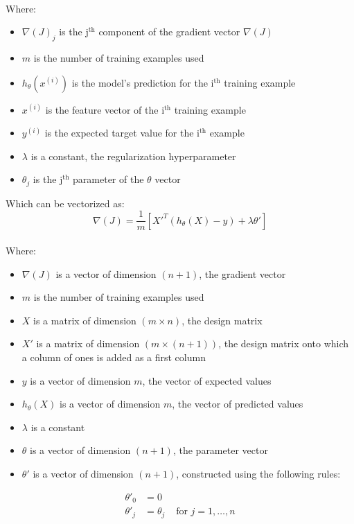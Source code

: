 \\
Where:  
\begin{itemize}
    \item $\nabla(J)_j$ is the j$^\text{th}$ component of the gradient vector $\nabla(J)$
    \item $m$ is the number of training examples used
    \item $h_\theta(x^{(i)})$ is the model's prediction for the i$^\text{th}$ training example
    \item $x^{(i)}$ is the feature vector of the i$^\text{th}$ training example
    \item $y^{(i)}$ is the expected target value for the i$^\text{th}$ example
    \item $\lambda$ is a constant, the regularization hyperparameter
    \item $\theta_j$ is the j$^\text{th}$ parameter of the $\theta$ vector
\end{itemize}
\bigskip
Which can be vectorized as:
$$
\nabla(J) = \frac{1}{m} [X'^T(h_\theta(X) - y) + \lambda \theta']
$$  
\\
Where:  
\begin{itemize}
    \item $\nabla(J)$ is a vector of dimension $(n + 1)$, the gradient vector
    \item $m$ is the number of training examples used
    \item $X$ is a matrix of dimension $(m \times n)$, the design matrix
    \item $X'$ is a matrix of dimension $(m \times (n + 1))$, the design matrix onto 
    which a column of ones is added as a first column
    \item $y$ is a vector of dimension $m$, the vector of expected values
    \item $h_\theta(X)$ is a vector of dimension $m$, the vector of predicted values
    \item $\lambda$ is a constant
    \item $\theta$ is a vector of dimension $(n + 1)$, the parameter vector
    \item $\theta'$ is a vector of dimension $(n + 1)$, constructed using the following rules:
\end{itemize}

$$
\begin{matrix}
\theta'_0 & =  0 \\
\theta'_j & =  \theta_j & \text{ for } j = 1, \dots, n\\    
\end{matrix}
$$

